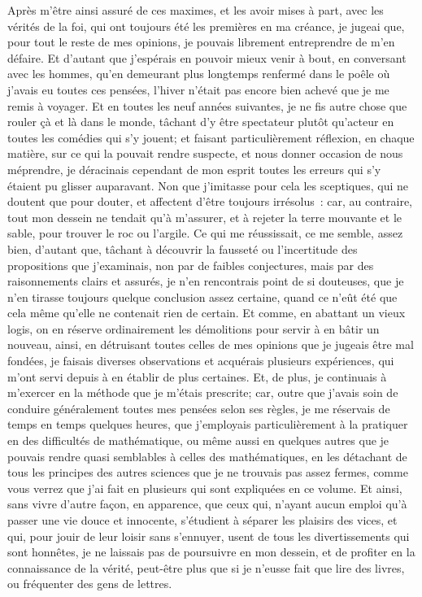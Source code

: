 \documentclass[french,twoside]{book} %
\begin{document}
Après m'être ainsi assuré de ces maximes, et les avoir mises à part, avec les vérités de la foi, qui ont toujours été les premières en ma créance, je jugeai que, pour tout le reste de mes opinions, je pouvais librement entreprendre de m'en défaire. Et d'autant que j'espérais en pouvoir mieux venir à bout, en conversant avec les hommes, qu'en demeurant plus longtemps renfermé dans le poêle où j'avais eu toutes ces pensées, l'hiver n'était pas encore bien achevé que je me remis à voyager. Et en toutes les neuf années suivantes, je ne fis autre chose que rouler çà et là dans le monde, tâchant d'y être spectateur plutôt qu'acteur en toutes les comédies qui s'y jouent; et faisant particulièrement réflexion, en chaque matière, sur ce qui la pouvait rendre suspecte, et nous donner occasion de nous méprendre, je déracinais cependant de mon esprit toutes les erreurs qui s'y étaient pu glisser auparavant. Non que j'imitasse pour cela les sceptiques, qui ne doutent que pour douter, et affectent d'être toujours irrésolus : car, au contraire, tout mon dessein ne tendait qu'à m'assurer, et à rejeter la terre mouvante et le sable, pour trouver le roc ou l'argile. Ce qui me réussissait, ce me semble, assez bien, d'autant que, tâchant à découvrir la fausseté ou l'incertitude des propositions que j'examinais, non par de faibles conjectures, mais par des raisonnements clairs et assurés, je n'en rencontrais point de si douteuses, que je n'en tirasse toujours quelque conclusion assez certaine, quand ce n'eût été que cela même qu'elle ne contenait rien de certain. Et comme, en abattant un vieux logis, on en réserve ordinairement les démolitions pour servir à en bâtir un nouveau, ainsi, en détruisant toutes celles de mes opinions que je jugeais être mal fondées, je faisais diverses observations et acquérais plusieurs expériences, qui m'ont servi depuis à en établir de plus certaines. Et, de plus, je continuais à m'exercer en la méthode que je m'étais prescrite; car, outre que j'avais soin de conduire généralement toutes mes pensées selon ses règles, je me réservais de temps en temps quelques heures, que j'employais particulièrement à la pratiquer en des difficultés de mathématique, ou même aussi en quelques autres que je pouvais rendre quasi semblables à celles des mathématiques, en les détachant de tous les principes des autres sciences que je ne trouvais pas assez fermes, comme vous verrez que j'ai fait en plusieurs qui sont expliquées en ce volume. Et ainsi, sans vivre d'autre façon, en apparence, que ceux qui, n'ayant aucun emploi qu'à passer une vie douce et innocente, s'étudient à séparer les plaisirs des vices, et qui, pour jouir de leur loisir sans s'ennuyer, usent de tous les divertissements qui sont honnêtes, je ne laissais pas de poursuivre en mon dessein, et de profiter en la connaissance de la vérité, peut-être plus que si je n'eusse fait que lire des livres, ou fréquenter des gens de lettres.\par
\end{document}
